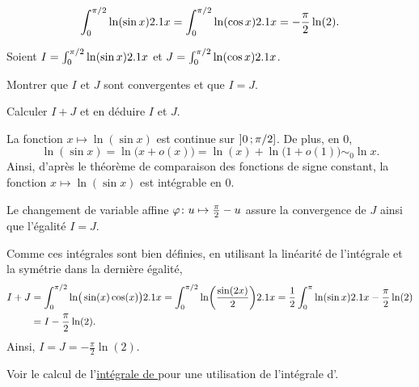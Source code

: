 \begin{marginfigure}[0cm]
    
\end{marginfigure}


\begin{prop}
\[
\int_0^{\pi/2} \ln(\sin x) \d x
= \int_0^{\pi/2} \ln(\cos x) \d x
= -\frac{\pi}{2} \ln(2).
\]
\end{prop}

\begin{exercice}\label{exercice:integraleEuler}
    Soient $I = \int_0^{\pi/2} \ln(\sin x) \d x$ et $J = \int_0^{\pi/2} \ln(\cos x) \d x$.
    \begin{questions}
        \item Montrer que $I$ et $J$ sont convergentes et que $I = J$.
        \item Calculer $I + J$ et en déduire $I$ et $J$.
    \end{questions}
\end{exercice}


\begin{elemsolution}
\begin{reponses}
\item La fonction $x \mapsto \ln(\sin x)$ est continue sur $\interof{0}{\pi/2}$. De plus, en $0$,
\[
\ln(\sin x) = \ln\mathopen{}\big(x + o(x)\big) = \ln(x) + \ln\mathopen{}\big(1 + o(1)\big) \sim_0 \ln x.
\]
Ainsi, d'après le théorème de comparaison des fonctions de signe constant, la fonction $x \mapsto \ln(\sin x)$ est intégrable en $0$.

Le changement de variable affine $\fonctionligne[\varphi]{u}{\frac{\pi}{2} - u}$ assure la convergence de $J$ ainsi que l'égalité $I = J$.

\item Comme ces intégrales sont bien définies, en utilisant la linéarité de l'intégrale et la symétrie dans la dernière égalité,
\begin{align*}
I + J &= \int_0^{\pi/2} \ln\mathopen{}\big( \sin(x) \cos(x) \big) \d x = \int_0^{\pi/2} \ln(\frac{\sin(2x)}{2}) \d x = \frac{1}{2} \int_0^\pi \ln(\sin x) \d x - \frac{\pi}{2} \ln(2) \\
&= I - \frac{\pi}{2} \ln(2).
\end{align*}
Ainsi, $I = J = -\frac{\pi}{2} \ln(2)$.
\end{reponses}
\end{elemsolution}
Voir le calcul de l'\hyperref[exercice:integralePoisson]{intégrale de } pour une utilisation de l'intégrale d'.

